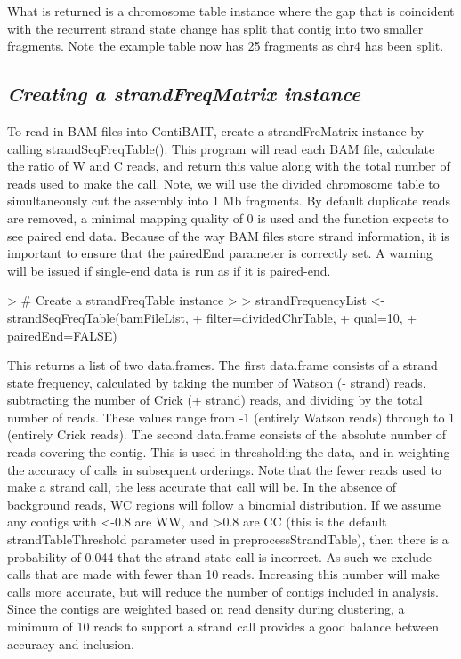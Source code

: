 \documentclass{article}
\begin{document}
What is returned is a chromosome table instance where the gap that is coincident with the recurrent strand state change has split that contig into two smaller fragments. Note the example table now has 25 fragments as chr4 has been split.

\subsection{\textit{Creating a strandFreqMatrix instance}}

To read in BAM files into ContiBAIT, create a strandFreMatrix instance by calling strandSeqFreqTable().  This program will read each BAM file, calculate the ratio of W and C reads, and return this value along with the total number of reads used to make the call. Note, we will use the divided chromosome table to simultaneously cut the assembly into 1 Mb fragments.  By default duplicate reads are removed, a minimal mapping quality of 0 is used and the function expects to see paired end data. Because of the way BAM files store strand information, it is important to ensure that the pairedEnd parameter is correctly set. A warning will be issued if single-end data is run as if it is paired-end.

\begin{Schunk}
\begin{Sinput}
> # Create a strandFreqTable instance 
> 
> strandFrequencyList <- strandSeqFreqTable(bamFileList, 
+ filter=dividedChrTable,
+ qual=10, 
+ pairedEnd=FALSE)
\end{Sinput}
\end{Schunk}

This returns a list of two data.frames.  The first data.frame consists of a strand state frequency, calculated by taking the number of Watson (- strand) reads, subtracting the number of Crick (+ strand) reads, and dividing by the total number of reads.  These values range from -1 (entirely Watson reads) through to 1 (entirely Crick reads).  The second data.frame consists of the absolute number of reads covering the contig. This is used in thresholding the data, and in weighting the accuracy of calls in subsequent orderings. Note that the fewer reads used to make a strand call, the less accurate that call will be. In the absence of background reads, WC regions will follow a binomial distribution. If we assume any contigs with <-0.8 are WW, and >0.8 are CC (this is the default strandTableThreshold parameter used in preprocessStrandTable), then there is a probability of 0.044 that the strand state call is incorrect. As such we exclude calls that are made with fewer than 10 reads. Increasing this number will make calls more accurate, but will reduce the number of contigs included in analysis. Since the contigs are weighted based on read density during clustering, a minimum of 10 reads to support a strand call provides a good balance between accuracy and inclusion.
\end{document}
